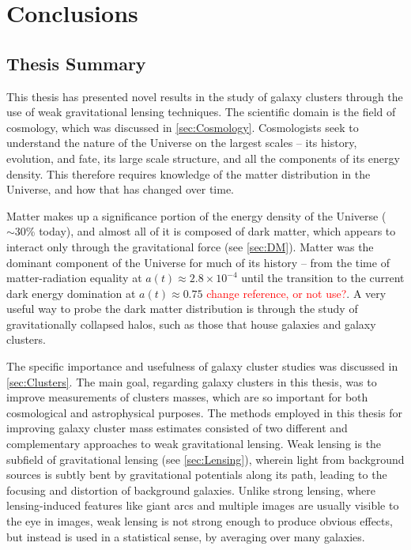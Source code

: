 
\chapter{Conclusions}
\label{ch:conc}


\section{Thesis Summary}
\label{sec:summary}

This thesis has presented novel results in the study of galaxy clusters through the use of weak gravitational lensing techniques. The scientific domain is the field of cosmology, which was discussed in \autoref{sec:Cosmology}. Cosmologists seek to understand the nature of the Universe on the largest scales -- its history, evolution, and fate, its large scale structure, and all the components of its energy density. This therefore requires knowledge of the matter distribution in the Universe, and how that has changed over time. 

Matter makes up a significance portion of the energy density of the Universe ($\sim30$\% today), and almost all of it is composed of dark matter, which appears to interact only through the gravitational force (see \autoref{sec:DM}). Matter was the dominant component of the Universe for much of its history -- from the time of matter-radiation equality at $a(t) \approx 2.8 \times 10^{-4}$ until the transition to the current dark energy domination at $a(t) \approx 0.75$ \citep{RydenText} \textcolor{red}{change reference, or not use?}. A very useful way to probe the dark matter distribution is through the study of gravitationally collapsed halos, such as those that house galaxies and galaxy clusters.

The specific importance and usefulness of galaxy cluster studies was discussed in \autoref{sec:Clusters}. The main goal, regarding galaxy clusters in this thesis, was to improve measurements of clusters masses, which are so important for both cosmological and astrophysical purposes. The methods employed in this thesis for improving galaxy cluster mass estimates consisted of two different and complementary approaches to weak gravitational lensing. Weak lensing is the subfield of gravitational lensing (see \autoref{sec:Lensing}), wherein light from background sources is subtly bent by gravitational potentials along its path, leading to the focusing and distortion of background galaxies. Unlike strong lensing, where lensing-induced features like giant arcs and multiple images are usually visible to the eye in images, weak lensing is not strong enough to produce obvious effects, but instead is used in a statistical sense, by averaging over many galaxies.

